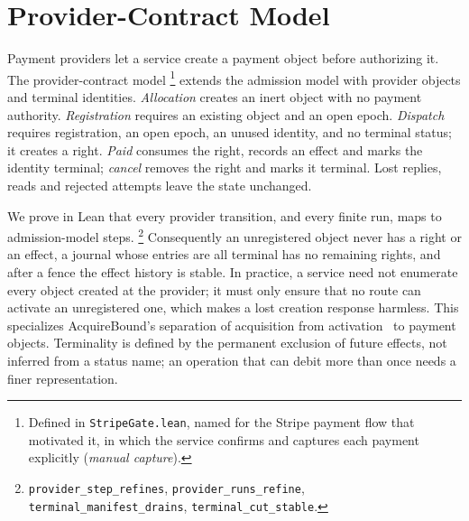 \documentclass[runningheads]{llncs}
\newcommand{\code}[1]{\texttt{\small #1}}
\begin{document}
\section{Provider-Contract Model}
\label{sec:mapping}
Payment providers let a service create a payment object before authorizing
it. The provider-contract model%
\footnote{\raggedright Defined in \code{StripeGate.lean}, named for the Stripe
payment flow that motivated it, in which the service confirms and captures each
payment explicitly (\emph{manual capture}).\par}
extends the admission model with provider objects and terminal identities.
\emph{Allocation} creates an inert object with no payment authority.
\emph{Registration} requires an existing object and an open epoch.
\emph{Dispatch} requires registration, an open epoch, an unused identity, and
no terminal status; it creates a right. \emph{Paid} consumes the right, records
an effect and marks the identity terminal; \emph{cancel} removes the right and
marks it terminal. Lost replies, reads and rejected attempts leave the state
unchanged.

We prove in Lean that every provider transition, and every finite run, maps to
admission-model steps.%
\footnote{\raggedright \code{provider\_step\_refines},
\code{provider\_runs\_refine}, \code{terminal\_manifest\_drains},
\code{terminal\_cut\_stable}.\par}
Consequently an unregistered object never has a right or an effect, a journal
whose entries are all terminal has no remaining rights, and after a fence the
effect history is stable. In practice, a service need not enumerate every
object created at the provider; it must only ensure that no route can activate
an unregistered one, which makes a lost creation response harmless. This
specializes AcquireBound's separation of acquisition from
activation~\cite{acquirebound} to payment objects. Terminality is defined by the
permanent exclusion of future effects, not inferred from a status name; an
operation that can debit more than once needs a finer representation.
\end{document}
